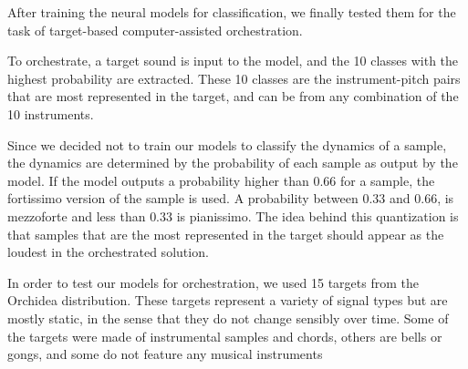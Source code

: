 \documentclass[runningheads,a4paper]{llncs}
\begin{document}
After training the neural models for classification, we finally tested them for the task of target-based computer-assisted orchestration. 

To orchestrate, a target sound is input to the model, and the 10 classes with the highest probability are extracted. These 10 classes are the instrument-pitch pairs that are most represented in the target, and can be from any combination of the 10 instruments. 

Since we decided not to train our models to classify the dynamics of a sample, the dynamics are determined by the probability of each sample as output by the model. If the model outputs a probability higher than $0.66$ for a sample, the fortissimo version of the sample is used. A probability between $0.33$ and $0.66$, is mezzoforte and less than $0.33$ is pianissimo. The idea behind this quantization is that samples that are the most represented in the target should appear as the loudest in the orchestrated solution.

In order to test our models for orchestration, we used 15 targets from the Orchidea distribution. These targets represent a variety of signal types but are mostly static, in the sense that they do not change sensibly over time. Some of the targets were made of instrumental samples and chords, others are bells or gongs, and some do not feature any musical instruments
\end{document}
